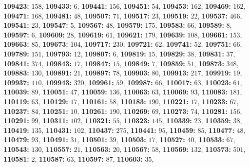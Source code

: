 \textsf{\bfseries 109423:} $158$, \textsf{\bfseries 109433:} $6$, \textsf{\bfseries 109441:} $156$, \textsf{\bfseries 109451:} $54$, \textsf{\bfseries 109453:} $162$, \textsf{\bfseries 109469:} $162$, \textsf{\bfseries 109471:} $168$, \textsf{\bfseries 109481:} $48$, \textsf{\bfseries 109507:} $71$, \textsf{\bfseries 109517:} $23$, \textsf{\bfseries 109519:} $22$, \textsf{\bfseries 109537:} $466$, \textsf{\bfseries 109541:} $23$, \textsf{\bfseries 109547:} $5$, \textsf{\bfseries 109567:} $48$, \textsf{\bfseries 109579:} $175$, \textsf{\bfseries 109583:} $66$, \textsf{\bfseries 109589:} $8$, \textsf{\bfseries 109597:} $6$, \textsf{\bfseries 109609:} $28$, \textsf{\bfseries 109619:} $61$, \textsf{\bfseries 109621:} $179$, \textsf{\bfseries 109639:} $108$, \textsf{\bfseries 109661:} $153$, \textsf{\bfseries 109663:} $85$, \textsf{\bfseries 109673:} $104$, \textsf{\bfseries 109717:} $230$, \textsf{\bfseries 109721:} $62$, \textsf{\bfseries 109741:} $52$, \textsf{\bfseries 109751:} $66$, \textsf{\bfseries 109789:} $151$, \textsf{\bfseries 109793:} $12$, \textsf{\bfseries 109807:} $6$, \textsf{\bfseries 109819:} $15$, \textsf{\bfseries 109829:} $38$, \textsf{\bfseries 109831:} $37$, \textsf{\bfseries 109841:} $374$, \textsf{\bfseries 109843:} $17$, \textsf{\bfseries 109847:} $15$, \textsf{\bfseries 109849:} $7$, \textsf{\bfseries 109859:} $51$, \textsf{\bfseries 109873:} $348$, \textsf{\bfseries 109883:} $130$, \textsf{\bfseries 109891:} $21$, \textsf{\bfseries 109897:} $78$, \textsf{\bfseries 109903:} $80$, \textsf{\bfseries 109913:} $217$, \textsf{\bfseries 109919:} $19$, \textsf{\bfseries 109937:} $110$, \textsf{\bfseries 109943:} $320$, \textsf{\bfseries 109961:} $59$, \textsf{\bfseries 109987:} $66$, \textsf{\bfseries 110017:} $63$, \textsf{\bfseries 110023:} $61$, \textsf{\bfseries 110039:} $89$, \textsf{\bfseries 110051:} $47$, \textsf{\bfseries 110059:} $136$, \textsf{\bfseries 110063:} $63$, \textsf{\bfseries 110069:} $93$, \textsf{\bfseries 110083:} $181$, \textsf{\bfseries 110119:} $63$, \textsf{\bfseries 110129:} $17$, \textsf{\bfseries 110161:} $58$, \textsf{\bfseries 110183:} $190$, \textsf{\bfseries 110221:} $17$, \textsf{\bfseries 110233:} $67$, \textsf{\bfseries 110237:} $84$, \textsf{\bfseries 110251:} $10$, \textsf{\bfseries 110261:} $190$, \textsf{\bfseries 110269:} $69$, \textsf{\bfseries 110273:} $74$, \textsf{\bfseries 110281:} $156$, \textsf{\bfseries 110291:} $99$, \textsf{\bfseries 110311:} $102$, \textsf{\bfseries 110321:} $55$, \textsf{\bfseries 110323:} $145$, \textsf{\bfseries 110339:} $23$, \textsf{\bfseries 110359:} $38$, \textsf{\bfseries 110419:} $135$, \textsf{\bfseries 110431:} $102$, \textsf{\bfseries 110437:} $275$, \textsf{\bfseries 110441:} $95$, \textsf{\bfseries 110459:} $85$, \textsf{\bfseries 110477:} $48$, \textsf{\bfseries 110479:} $93$, \textsf{\bfseries 110491:} $31$, \textsf{\bfseries 110501:} $39$, \textsf{\bfseries 110503:} $17$, \textsf{\bfseries 110527:} $40$, \textsf{\bfseries 110533:} $67$, \textsf{\bfseries 110543:} $130$, \textsf{\bfseries 110557:} $21$, \textsf{\bfseries 110563:} $20$, \textsf{\bfseries 110567:} $58$, \textsf{\bfseries 110569:} $132$, \textsf{\bfseries 110573:} $501$, \textsf{\bfseries 110581:} $2$, \textsf{\bfseries 110587:} $63$, \textsf{\bfseries 110597:} $87$, \textsf{\bfseries 110603:} $35$, 
